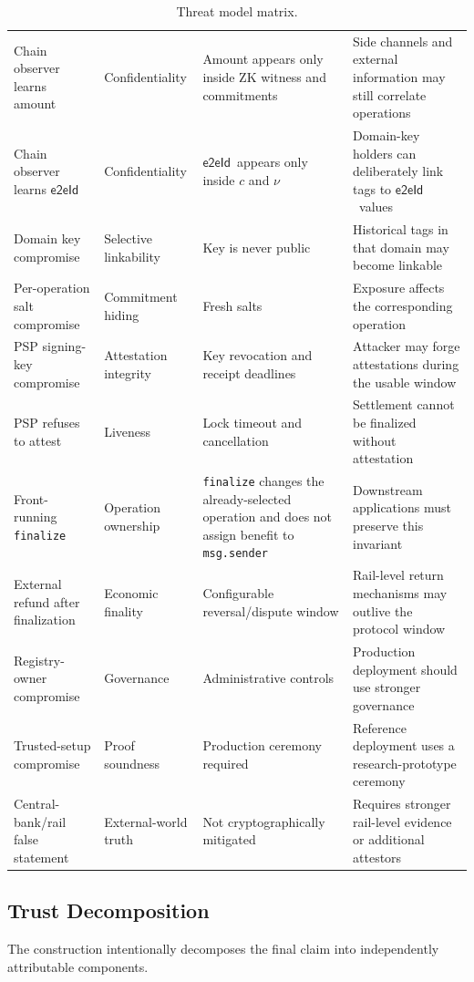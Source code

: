 \documentclass[10pt,twocolumn]{article}
\newcommand{\eeid}{\ensuremath{\mathsf{e2eId}}}
\newcommand{\code}[1]{\texttt{#1}}
\begin{document}
\begin{table}[t]
\begin{tabular}{@{}p{3.05cm}p{2.15cm}p{4.5cm}p{4.5cm}@{}}
Chain observer learns amount & Confidentiality & Amount appears only inside ZK witness and commitments & Side channels and external information may still correlate operations \\
Chain observer learns \eeid & Confidentiality & \eeid\ appears only inside $c$ and $\nu$ & Domain-key holders can deliberately link tags to \eeid\ values \\
Domain key compromise & Selective linkability & Key is never public & Historical tags in that domain may become linkable \\
Per-operation salt compromise & Commitment hiding & Fresh salts & Exposure affects the corresponding operation \\
PSP signing-key compromise & Attestation integrity & Key revocation and receipt deadlines & Attacker may forge attestations during the usable window \\
PSP refuses to attest & Liveness & Lock timeout and cancellation & Settlement cannot be finalized without attestation \\
Front-running \code{finalize} & Operation ownership & \code{finalize} changes the already-selected operation and does not assign benefit to \code{msg.sender} & Downstream applications must preserve this invariant \\
External refund after finalization & Economic finality & Configurable reversal/dispute window & Rail-level return mechanisms may outlive the protocol window \\
Registry-owner compromise & Governance & Administrative controls & Production deployment should use stronger governance \\
Trusted-setup compromise & Proof soundness & Production ceremony required & Reference deployment uses a research-prototype ceremony \\
Central-bank/rail false statement & External-world truth & Not cryptographically mitigated & Requires stronger rail-level evidence or additional attestors \\
\bottomrule
\end{tabular}
\caption{Threat model matrix.}
\end{table}

\subsection{Trust Decomposition}

The construction intentionally decomposes the final claim into
independently attributable components.
\end{document}
